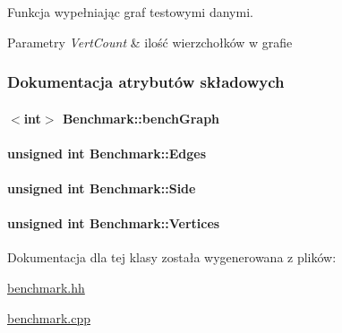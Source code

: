 Funkcja wypełniając graf testowymi danymi. 


\begin{DoxyParams}{Parametry}
{\em Vert\-Count} & ilość wierzchołków w grafie \\
\hline
\end{DoxyParams}


\subsubsection{Dokumentacja atrybutów składowych}
\hypertarget{class_benchmark_a94bdf26f3509801d37d3f06fa6c745d8}{
\paragraph[{bench\-Graph}]{$<$int$>$ Benchmark\-::bench\-Graph\hspace{0.3cm}{\ttfamily [private]}}}\label{class_benchmark_a94bdf26f3509801d37d3f06fa6c745d8}
\hypertarget{class_benchmark_afe068c6eb3c6971dd0d823deccc822fa}{
\paragraph[{Edges}]{\setlength{\rightskip}{0pt plus 5cm}unsigned int Benchmark\-::\-Edges\hspace{0.3cm}{\ttfamily [private]}}}\label{class_benchmark_afe068c6eb3c6971dd0d823deccc822fa}
\hypertarget{class_benchmark_a3d768cdb391522a3796b8467bb4d3e25}{
\paragraph[{Side}]{\setlength{\rightskip}{0pt plus 5cm}unsigned int Benchmark\-::\-Side\hspace{0.3cm}{\ttfamily [private]}}}\label{class_benchmark_a3d768cdb391522a3796b8467bb4d3e25}
\hypertarget{class_benchmark_ab3f9d026bf9452eeda561157747acff4}{
\paragraph[{Vertices}]{\setlength{\rightskip}{0pt plus 5cm}unsigned int Benchmark\-::\-Vertices\hspace{0.3cm}{\ttfamily [private]}}}\label{class_benchmark_ab3f9d026bf9452eeda561157747acff4}


Dokumentacja dla tej klasy została wygenerowana z plików\-:\begin{DoxyCompactItemize}
\item 
\hyperlink{benchmark_8hh}{benchmark.\-hh}\item 
\hyperlink{benchmark_8cpp}{benchmark.\-cpp}\end{DoxyCompactItemize}
